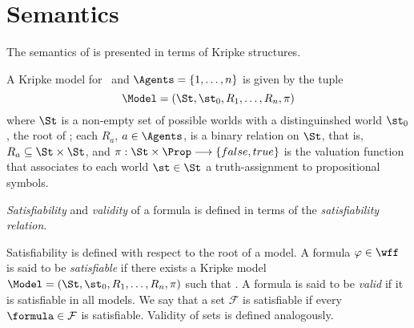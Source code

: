 \section{Semantics}
\label{semantics}

The semantics of  is presented in terms of Kripke structures.

\begin{definition}
    A Kripke model for \Prop~and $\Agents = \{1, \ldots, n\}$ is given by the tuple 
    \begin{equation}
        \Model = (\St, \st_0, R_1, \ldots, R_n, \pi)
    \end{equation}
    where $\St$ is a non-empty set of possible worlds with a distinguinshed world
    $\st_0$, the root of \Model; each $R_a$, $a \in \Agents$, is a binary relation
    on $\St$, that is, $R_a \subseteq \St \times \St$, and $\pi: \St \times \Prop
    \longrightarrow \{false, true\}$ is the valuation function that associates
    to each world $\st \in \St$ a truth-assignment to propositional symbols.
\end{definition}

\emph{Satisfiability} and \emph{validity} of a formula is defined in terms of the \emph{satisfiability relation}.


Satisfiability is defined with respect to the root of a model. A formula $\varphi
\in \wff$ is said to be \emph{satisfiable} if there exists a Kripke model
$\Model = (\St, \st_0, R_1, \ldots, R_n, \pi)$ such that
. A formula is said to be \emph{valid} if it is
satisfiable in all models. We say that a set $\mathcal{F}$ is satisfiable if
every $\formula \in \mathcal{F}$ is satisfiable. Validity of sets is defined
analogously. 

